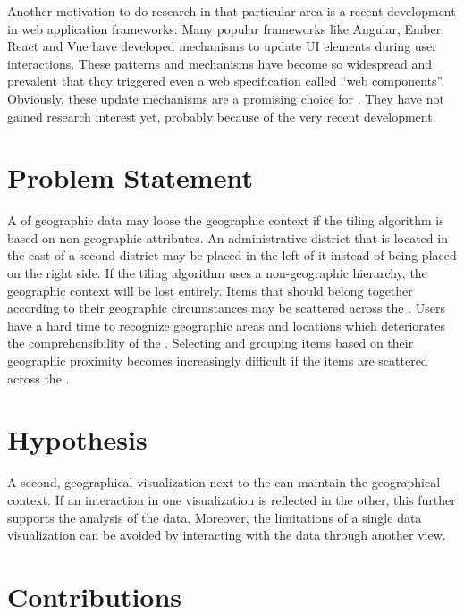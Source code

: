 Another motivation to do research in that particular area is a recent development in web application frameworks:
Many popular frameworks like Angular, Ember, React and Vue have developed mechanisms to update UI elements during user interactions.
These patterns and mechanisms have become so widespread and prevalent that they triggered even a web specification called ``web components''.
Obviously, these update mechanisms are a promising choice for \cmvs{}.
They have not gained research interest yet, probably because of the very recent development.

\section{Problem Statement}
%
A \tmap{} of geographic data may loose the geographic context if the tiling algorithm is based on non-geographic attributes.
An administrative district that is located in the east of a second district may be placed in the \tmap{} left of it instead of being placed on the right side.
If the tiling algorithm uses a non-geographic hierarchy, the geographic context will be lost entirely.
Items that should belong together according to their geographic circumstances may be scattered across the \tmap{}.
Users have a hard time to recognize geographic areas and locations which deteriorates the comprehensibility of the \tmap{}.
Selecting and grouping items based on their geographic proximity becomes increasingly difficult if the items are scattered across the \tmap{}.


\section{Hypothesis}

A second, geographical visualization next to the \tmap{} can maintain the geographical context.
If an interaction in one visualization is reflected in the other, this further supports the analysis of the data.
Moreover, the limitations of a single data visualization can be avoided by interacting with the data through another view.


\section{Contributions}

